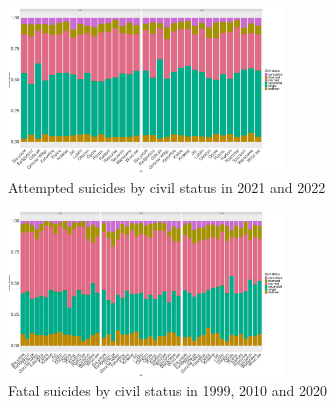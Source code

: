 \documentclass{article}
\begin{document}
\begin{figure}[H]
    \centering
    \includegraphics[width=0.65\textwidth]{imgs/status_city_att_suicides-2122.pdf}
    \caption{Attempted suicides by civil status  in 2021 and 2022}
    \label{fig:status_city_att_suicides-2122}
\end{figure}

\begin{figure}[H]
    \centering
    \includegraphics[width=0.65\textwidth]{imgs/status_city_fat_suicides-991020.pdf}
    \caption{Fatal suicides by civil status  in 1999, 2010 and 2020}
    \label{fig:status_city_fat_suicides-991020}
\end{figure}
\end{document}
